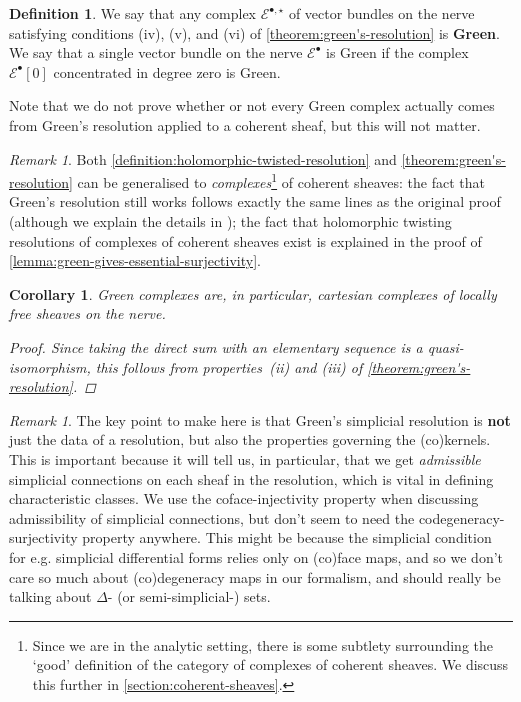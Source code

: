 \documentclass[11pt,fleqn]{article}
\theoremstyle{plain}
\newtheorem{corollary}[theorem]{Corollary}
\theoremstyle{definition}
\newtheorem{definition}[theorem]{Definition}
\theoremstyle{remark}
\newtheorem{remark}[theorem]{Remark}
\numberwithin{equation}{theorem}
\newcommand{\anotherbullet}{\star}
\newcommand{\define}[1]{\textbf{#1}}
\begin{document}
        \begin{definition}\label{definition:Gre{}en}
            We say that any complex $\mathcal{E}^{\bullet,\anotherbullet}$ of vector bundles on the nerve satisfying conditions (iv), (v), and (vi) of \cref{theorem:green's-resolution} is \define{Gre{}en}.
            We say that a single vector bundle on the nerve $\mathcal{E}^\bullet$ is Gre{}en if the complex $\mathcal{E}^\bullet[0]$ concentrated in degree zero is Gre{}en.

            Note that we do not prove whether or not every Green complex actually comes from Green's resolution applied to a coherent sheaf, but this will not matter.
        \end{definition}

        \begin{remark}
            Both \cref{definition:holomorphic-twisted-resolution} and \cref{theorem:green's-resolution} can be generalised to \emph{complexes}\footnote{Since we are in the analytic setting, there is some subtlety surrounding the `good' definition of the category of complexes of coherent sheaves. We discuss this further in \cref{section:coherent-sheaves}.} of coherent sheaves: the fact that Green's resolution still works follows exactly the same lines as the original proof (although we explain the details in \cite{Hosgood2020}); the fact that holomorphic twisting resolutions of complexes of coherent sheaves exist is explained in the proof of \cref{lemma:green-gives-essential-surjectivity}.
        \end{remark}

        \begin{corollary}\label{corollary:green-gives-cartesian-things}
            Green complexes are, in particular, \emph{cartesian} complexes of locally free sheaves on the nerve.
            \begin{proof}
                Since taking the direct sum with an elementary sequence is a quasi-isomorphism, this follows from properties~(ii) and (iii) of \cref{theorem:green's-resolution}.
            \end{proof}
        \end{corollary}

        \begin{remark}
            The key point to make here is that Green's simplicial resolution is \textbf{not} just the data of a resolution, but also the properties governing the (co)kernels.
            This is important because it will tell us, in particular, that we get \emph{admissible} simplicial connections on each sheaf in the resolution, which is vital in defining characteristic classes.
            We use the coface-injectivity property when discussing admissibility of simplicial connections, but don't seem to need the codegeneracy-surjectivity property anywhere.
            This might be because the simplicial condition for e.g. simplicial differential forms relies only on (co)face maps, and so we don't care so much about (co)degeneracy maps in our formalism, and should really be talking about $\Delta$- (or semi-simplicial-) sets.
        \end{remark}
\end{document}
